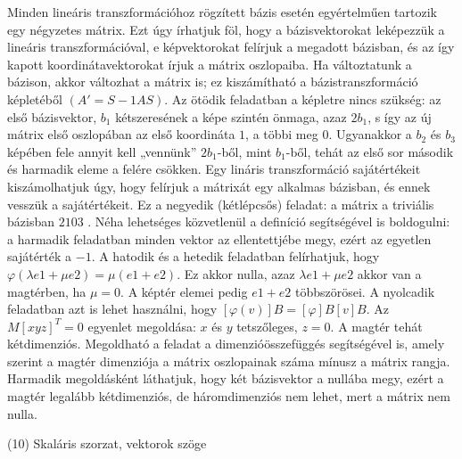 \begin{frame}
  \begin{tcolorbox}[title={9/4. {\symrook}}]
    Minden lineáris transzformációhoz rögzített bázis esetén egyértelműen tartozik egy négyzetes mátrix. Ezt úgy írhatjuk föl, hogy a bázisvektorokat leképezzük a lineáris transzformációval, e képvektorokat felírjuk a megadott bázisban, és az így kapott koordinátavektorokat írjuk a mátrix oszlopaiba. Ha változtatunk a bázison, akkor változhat a mátrix is; ez kiszámítható a bázistranszformáció képletéből $(A' = S-1AS)$. Az ötödik feladatban a képletre nincs szükség: az első bázisvektor, $b_1$ kétszeresének a képe szintén önmaga, azaz $2b_1$, s így az új mátrix első oszlopában az első koordináta $1$, a többi meg $0$. Ugyanakkor a $b_2$ és $b_3$ képében fele annyit kell „vennünk” $2b_1$-ből, mint $b_1$-ből, tehát az első sor második és harmadik eleme a felére csökken. Egy lináris transzformáció sajátértékeit kiszámolhatjuk úgy, hogy felírjuk a mátrixát egy alkalmas bázisban, és ennek vesszük a sajátértékeit. Ez a negyedik (kétlépcsős) feladat: a mátrix a triviális bázisban  $2 1 0 3$ . Néha lehetséges közvetlenül a definíció segítségével is boldogulni: a harmadik feladatban minden vektor az ellentettjébe megy, ezért az egyetlen sajátérték a $-1$. A hatodik és a hetedik feladatban felírhatjuk, hogy ${\varphi}({\lambda}e1 + {\mu}e2) = {\mu}(e1 + e2)$. Ez akkor nulla, azaz ${\lambda}e1 + {\mu}e2$ akkor van a magtérben, ha ${\mu} = 0$. A képtér elemei pedig $e1 + e2$ többszörösei. A nyolcadik feladatban azt is lehet használni, hogy $[{\varphi}(v)]B = [{\varphi}]B[v]B$. Az $M[x y z]^T = 0$ egyenlet megoldása: $x$ és $y$ tetszőleges, $z = 0$. A magtér tehát kétdimenziós. Megoldható a feladat a dimenzióösszefüggés segítségével is, amely szerint a magtér dimenziója a mátrix oszlopainak száma mínusz a mátrix rangja. Harmadik megoldásként láthatjuk, hogy két bázisvektor a nullába megy, ezért a magtér legalább kétdimenziós, de háromdimenziós nem lehet, mert a mátrix nem nulla.

  \end{tcolorbox}
\end{frame}


\begin{frame}[plain]
\begin{tcolorbox}[center, colback={myyellow}, coltext={black}, colframe={myyellow}]
    {\RHuge  (10) Skaláris szorzat, vektorok szöge }
    \mmedskip
\end{tcolorbox}
\end{frame}

